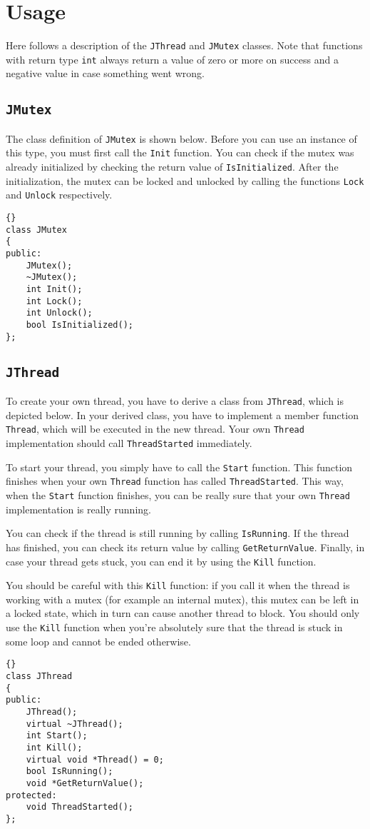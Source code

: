 \documentclass[a4paper,12pt]{article}
\begin{document}
	\section{Usage}

	Here follows a description of the {\tt JThread} and {\tt JMutex} classes. 
	Note that functions with return type {\tt int} always return a value of zero
	or more on success and a negative value in case something went wrong.

	\subsection{{\tt JMutex}}

	The class definition of {\tt JMutex} is shown below. Before you can use an
	instance of this type, you must first call the {\tt Init} function. You can
	check if the mutex was already initialized by checking the return value
	of {\tt IsInitialized}. After the initialization, the mutex can be locked
	and unlocked by calling the functions {\tt Lock} and {\tt Unlock} respectively.

\begin{lstlisting}[frame=tb]{}
class JMutex
{
public:
	JMutex();
	~JMutex();
	int Init();
	int Lock();
	int Unlock();
	bool IsInitialized();
};	
\end{lstlisting}

	\subsection{{\tt JThread}}
	
	To create your own thread, you have to derive a class from {\tt JThread},
	which is depicted below. In your derived class, you have to implement
	a member function {\tt Thread}, which will be executed in the new thread.
	Your own {\tt Thread} implementation should call {\tt ThreadStarted}
	immediately.

	To start your thread, you simply have to call the {\tt Start} function.
	This function finishes when your own {\tt Thread} function has called
	{\tt ThreadStarted}. This way, when the {\tt Start} function
	finishes, you can be really sure that your own {\tt Thread} implementation
	is really running.

	You can check if the thread is still running by calling {\tt IsRunning}.
	If the thread has finished, you can check its return value by calling
	{\tt GetReturnValue}. Finally, in case your thread gets stuck, you can
	end it by using the {\tt Kill} function.

	You should be careful with this {\tt Kill} function: if you call it when
	the thread is working with a mutex (for example an internal mutex), this
	mutex can be left in a locked state, which in turn can cause another thread
	to block. You should only use the {\tt Kill} function when you're absolutely
	sure that the thread is stuck in some loop and cannot be ended otherwise.

\begin{lstlisting}[frame=tb]{}
class JThread
{
public:
	JThread();
	virtual ~JThread();
	int Start();
	int Kill();
	virtual void *Thread() = 0;
	bool IsRunning();
	void *GetReturnValue();
protected:
	void ThreadStarted();
};
\end{lstlisting}
	
\end{document}
